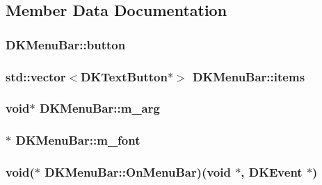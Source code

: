 \subsection{Member Data Documentation}
\hypertarget{class_d_k_menu_bar_ad8d1d50f649ca014a8b06bde77cec593}{
\subsubsection[{button}]{ D\-K\-Menu\-Bar\-::button}}\label{class_d_k_menu_bar_ad8d1d50f649ca014a8b06bde77cec593}
\hypertarget{class_d_k_menu_bar_a3dc201baa093589c9f9245308b82760e}{
\subsubsection[{items}]{\setlength{\rightskip}{0pt plus 5cm}std\-::vector$<${\bf D\-K\-Text\-Button}$\ast$$>$ D\-K\-Menu\-Bar\-::items}}\label{class_d_k_menu_bar_a3dc201baa093589c9f9245308b82760e}
\hypertarget{class_d_k_menu_bar_a93fe37e8aa8593c82b532d897436ce4b}{
\subsubsection[{m\-\_\-arg}]{\setlength{\rightskip}{0pt plus 5cm}void$\ast$ D\-K\-Menu\-Bar\-::m\-\_\-arg}}\label{class_d_k_menu_bar_a93fe37e8aa8593c82b532d897436ce4b}
\hypertarget{class_d_k_menu_bar_a53551d557413ec77ff8e6309bbb69713}{
\subsubsection[{m\-\_\-font}]{$\ast$ D\-K\-Menu\-Bar\-::m\-\_\-font}}\label{class_d_k_menu_bar_a53551d557413ec77ff8e6309bbb69713}
\hypertarget{class_d_k_menu_bar_a7e6412c179f238cd0d679b88a1a76efa}{
\subsubsection[{On\-Menu\-Bar}]{\setlength{\rightskip}{0pt plus 5cm}void($\ast$ D\-K\-Menu\-Bar\-::\-On\-Menu\-Bar)(void $\ast$, {\bf D\-K\-Event} $\ast$)}}\label{class_d_k_menu_bar_a7e6412c179f238cd0d679b88a1a76efa}
